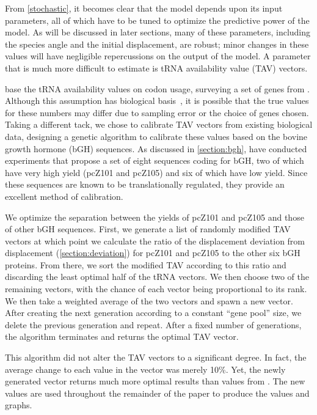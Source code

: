\documentclass[12pt]{article}
\numberwithin{equation}{section}
\begin{document}
From \autoref{stochastic}, it becomes clear that the model depends upon
its input parameters, all of which have to be tuned to optimize
the predictive power of the model.  As will be discussed in later sections,
many of these parameters, including the species angle and the initial displacement,
are robust; minor changes in these values will have negligible repercussions
on the output of the model.  A parameter that is much more difficult to estimate
is tRNA availability value (TAV) vectors.

\citeauthor{lalit:embs} base the tRNA availability values on codon usage, 
surveying a set of genes from \ecoli.
Although this assumption has biological basis~\cite{ikemura}, 
it is possible that the true values for these numbers may differ 
due to sampling error or the choice of genes chosen.
Taking a different tack, we chose to calibrate TAV vectors from
existing biological data, designing a genetic algorithm to calibrate
these values based on the bovine growth hormone (bGH) sequences.
As discussed in \autoref{section:bgh}, \citet{schoner:bgh}
have conducted experiments that propose a set of eight sequences coding for bGH,
two of which have very high yield (pcZ101 and pcZ105) and six of which have low yield.
Since these sequences are known to be translationally regulated, they
provide an excellent method of calibration.

We optimize the separation between the yields of pcZ101 and pcZ105 and those of other bGH sequences.  
First, we generate a list of randomly modified TAV vectors at which
point we calculate the ratio of the displacement deviation from
displacement (\autoref{section:deviation}) for pcZ101 and pcZ105 to the other
six bGH proteins. From there, we sort the modified TAV according to
this ratio and discarding the least optimal half of the tRNA
vectors. We then choose two of the remaining vectors, with the chance
of each vector being proportional to its rank.  We then take a
weighted average of the two vectors and spawn a new vector.  After
creating the next generation according to a constant ``gene pool''
size, we delete the previous generation and repeat. After a fixed
number of generations, the algorithm terminates and returns the
optimal TAV vector.

This algorithm did not alter the TAV vectors to a significant degree.
In fact, the average change to each value in the vector was merely
10\%.  Yet, the newly generated vector returns much more optimal
results than values from \citeauthor{lalit:embs}.  The new values
are used throughout the remainder of the paper to produce the 
values and graphs.
\end{document}

